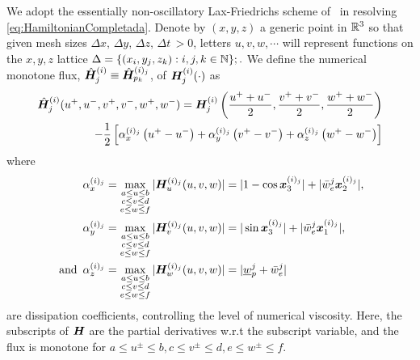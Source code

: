 We adopt the essentially non-oscillatory Lax-Friedrichs scheme of~\cite{OsherShuENO, Crandall1984Approx} in resolving \eqref{eq:HamiltonianCompletada}. Denote by $(x, y, z)$ a generic point in $\mathbb{R}^3$ so that given mesh sizes $\Delta x, \, \Delta y, \, \Delta z, \, \Delta t \, > 0$, letters $u,v,w,\cdots$ will represent functions on the $x,y,z$ lattice $\Delta=\{(x_i,y_j, z_k): i, j, k \in \mathbb{N}\}; .$%
We define the numerical monotone flux, 	$\hat{\bm{H}}_j^{(i)}\equiv \hat{\bm{H}}_{p_k}^{(i)_j}$, of $\bm{H}_j^{(i)}(\cdot)$ as 
%
\begin{align}
	\hat{\bm{H}}_j^{(i)}(u^+, u^-, v^+, v^-, w^+, w^-) = \bm{H}_j^{(i)}\left(\frac{u^+ +u^-}{2}, \frac{v^+ +v^-}{2}, \frac{w^+ +w^-}{2}\right) \nonumber
	\\
	- \dfrac{1}{2}\left[ \alpha_x^{(i)_j} \left(u^+ - u^-\right) + \alpha_y^{(i)_j}\left(v^+ - v^-\right) + \alpha_z^{(i)_j}\left(w^+ - w^-\right)\right]
\end{align}
%
where
%
\begin{subequations}
	\begin{align}
		\alpha_x^{(i)_j} &= \max_{\substack{ a \le u \le b \\ c \le v \le d  \\ e \le w \le f}} |\bm{H}_{u}^{(i)_j}(u, v, w)| = |1 - \cos \bm{x}_3^{(i)_j}|+ |\bar{w}_e^j \bm{x}_2^{(i)_j}|, 
		\\
		\, \alpha_y^{(i)_j} &= \max_{\substack{ a \le u \le b \\ c \le v \le d  \\ e \le w \le f}} |\bm{H}_{v}^{(i)_j}(u, v, w)| = |\sin \bm{x}_3^{(i)_j}| + |\bar{w}_e^j \bm{x}_1^{(i)_j}|, \,  \\
		\text{ and }\, \alpha_z^{(i)_j} &= \max_{\substack{ a \le u \le b \\ c \le v \le d  \\ e \le w \le f}} |\bm{H}_{w}^{(i)_j}(u, v, w)| = |\underline{w}_p^j + \bar{w}_e^j|
	\end{align}
\end{subequations}
%
are dissipation coefficients, controlling the level of numerical viscosity. Here, the subscripts of $\bm{H}$ are the partial derivatives w.r.t the subscript variable, and the flux is monotone for $a \le u^\pm \le b, c \le v^\pm \le d, e \le w^\pm \le f$.


